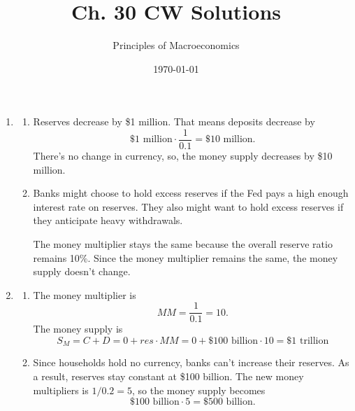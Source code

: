 \documentclass{article}
\title{Ch. 30 CW Solutions}
\author{Principles of Macroeconomics}
\date{\today}
\begin{document}
\maketitle

\begin{enumerate}

\item

	\begin{enumerate}

	\item Reserves decrease by \$1 million. That means deposits decrease by
		\begin{equation*}
		\$1 \text{ million} \cdot \frac{1}{0.1} = \$10 \text{ million}.
		\end{equation*}
		There's no change in currency, so, the money supply decreases by \$10 million.
		
	\item Banks might choose to hold excess reserves if the Fed pays a high enough interest rate on reserves. They also might want to hold excess reserves if they anticipate heavy withdrawals. 
	
	The money multiplier stays the same because the overall reserve ratio remains 10\%. Since the money multiplier remains the same, the money supply doesn't change. 
		
	\end{enumerate}
	
\item 

	\begin{enumerate}
	
	\item The money multiplier is \[ MM = \frac{1}{0.1} = 10. \] The money supply is
		\begin{equation*} 
		S_M = C + D = 0 + res \cdot MM = 0 + \$100 \text{ billion} \cdot 10 = \$1 \text{ trillion}
		\end{equation*}
		
	\item Since households hold no currency, banks can't increase their reserves. As a result, reserves stay constant at \$100 billion. The new money multipliers is $1 / 0.2 = 5$, so the money supply becomes 
		\begin{equation*}
		\$100 \text{ billion} \cdot 5 = \$500 \text{ billion}. 
		\end{equation*}
	
	\end{enumerate}
	

\end{enumerate}
\end{document}
